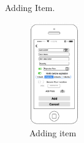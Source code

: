 Adding Item.
\begin{figure}[hbt!]
                	\centering
                   	\includegraphics[width=0.19\textwidth]{images/adding}
                    \caption{Adding item}
                \end{figure}
                
